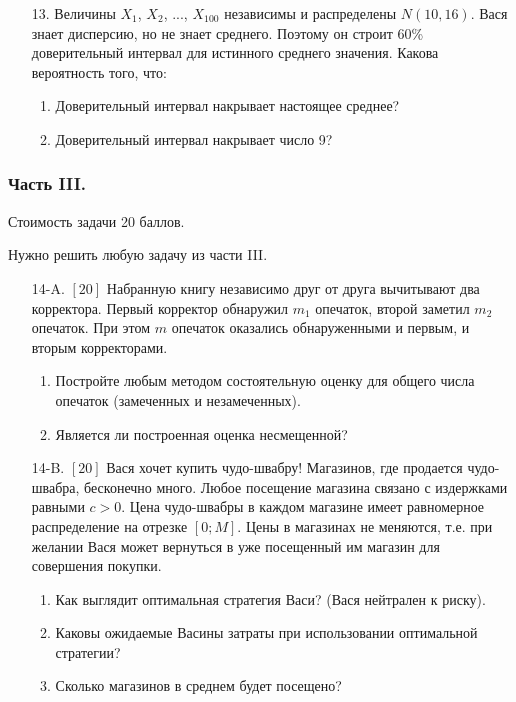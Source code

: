 \documentclass[12pt, a4paper]{article}\usepackage[]{graphicx}\usepackage[]{color}
\begin{document}
\begin{enumerate}
\item[13.] Величины $X_{1}$, $X_{2}$, ..., $X_{100}$ независимы и распределены $N(10,16)$. Вася знает дисперсию, но не знает среднего. Поэтому он строит 60\% доверительный интервал для истинного среднего значения. Какова вероятность того, что:
\begin{enumerate}
\item Доверительный интервал накрывает настоящее среднее?
\item Доверительный интервал накрывает число 9?
\end{enumerate}
\end{enumerate}

\subsubsection*{Часть III.}

Стоимость задачи 20 баллов.

Нужно решить любую \textbf{} задачу из части III.

\begin{enumerate}
\item[14-A.] $[20]$ Набранную книгу независимо друг от друга вычитывают два корректора. Первый корректор обнаружил $m_{1}$ опечаток, второй заметил $m_{2}$ опечаток. При этом $m$ опечаток оказались обнаруженными и первым, и вторым корректорами.
\begin{enumerate}
\item Постройте любым методом состоятельную оценку для общего числа опечаток (замеченных и незамеченных).
\item Является ли построенная оценка несмещенной?
\end{enumerate}

\item[14-B.]  $[20]$  Вася хочет купить чудо-швабру! Магазинов, где продается чудо-швабра, бесконечно много. Любое посещение магазина связано с издержками равными $c>0$. Цена чудо-швабры в каждом магазине имеет равномерное распределение на отрезке $[0;M]$. Цены в магазинах не меняются, т.е. при желании Вася может вернуться в уже посещенный им магазин для совершения покупки.
\begin{enumerate}
\item Как выглядит оптимальная стратегия Васи? (Вася нейтрален к риску).
\item Каковы ожидаемые Васины затраты при использовании оптимальной стратегии?
\item Сколько магазинов в среднем будет посещено?
\end{enumerate}
\end{enumerate}
\end{document}
